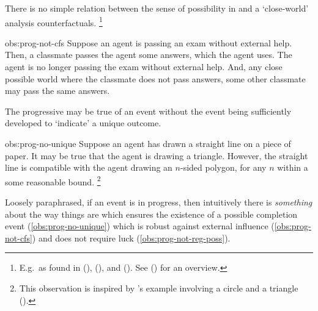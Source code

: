 \begin{note}
  \begin{observation}%
    \label{obs:prog-not-cfs}%
    There is no simple relation between the sense of possibility in \assuPP{} and a `close-world' analysis counterfactuals.%
    \footnote{
      E.g.\ as found in (\cite{Todd:1964aa}), (\cite{Stalnaker:1968vt}), and (\cite{Lewis:1973th}).
      See (\cite[\S2]{Starr:2022aa}) for an overview.
    }
  \end{observation}
  \begin{motivation}{obs:prog-not-cfs}
    Suppose an agent is passing an exam without external help.
    Then, a classmate passes the agent some answers, which the agent uses.
    The agent is no longer passing the exam without external help.
    And, any close possible world where the classmate does not pass answers, some other classmate may pass the same answers.
  \end{motivation}

  \begin{observation}%
    \label{obs:prog-no-unique}%
    The progressive may be true of an event without the event being sufficiently developed to `indicate' a unique outcome.
  \end{observation}
  \begin{motivation}{obs:prog-no-unique}
    Suppose an agent has drawn a straight line on a piece of paper.
    It may be true that the agent is drawing a triangle.
    However, the straight line is compatible with the agent drawing an \(n\)-sided polygon, for any \(n\) within a some reasonable bound.%
    \footnote{
      This observation is inspired by \citeauthor{Dowty:1979vq}'s example involving a circle and a triangle (\citeyear[133]{Dowty:1979vq}).
    }
  \end{motivation}

  \noindent%
  Loosely paraphrased, if an event is in progress, then intuitively there is \emph{something} about the way things are which ensures the existence of a possible completion event (\autoref{obs:prog-no-unique}) which is robust against external influence (\autoref{obs:prog-not-cfs}) and does not require luck (\autoref{obs:prog-not-reg-poss}).
\end{note}


